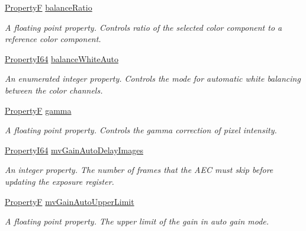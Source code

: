 \begin{DoxyCompactItemize}
\hyperlink{group___common_interface_gaf54865fe5a3d5cfd15f9a111b40d09f9}{Property\+F} \hyperlink{classmv_i_m_p_a_c_t_1_1acquire_1_1_gen_i_cam_1_1_analog_control_a7550a0dcc2b4d71a9431ba0090d857fc}{balance\+Ratio}
\begin{DoxyCompactList}\small\item\em A floating point property. Controls ratio of the selected color component to a reference color component. \end{DoxyCompactList}\item 
\hyperlink{group___common_interface_ga81749b2696755513663492664a18a893}{Property\+I64} \hyperlink{classmv_i_m_p_a_c_t_1_1acquire_1_1_gen_i_cam_1_1_analog_control_ac5a72d071c6ab6041347ec52179b0432}{balance\+White\+Auto}
\begin{DoxyCompactList}\small\item\em An enumerated integer property. Controls the mode for automatic white balancing between the color channels. \end{DoxyCompactList}\item 
\hyperlink{group___common_interface_gaf54865fe5a3d5cfd15f9a111b40d09f9}{Property\+F} \hyperlink{classmv_i_m_p_a_c_t_1_1acquire_1_1_gen_i_cam_1_1_analog_control_a89e3cff9a396ada4e88cc4910b5b03fb}{gamma}
\begin{DoxyCompactList}\small\item\em A floating point property. Controls the gamma correction of pixel intensity. \end{DoxyCompactList}\item 
\hyperlink{group___common_interface_ga81749b2696755513663492664a18a893}{Property\+I64} \hyperlink{classmv_i_m_p_a_c_t_1_1acquire_1_1_gen_i_cam_1_1_analog_control_a9312f2b8c8b6748cafbfc996a560550f}{mv\+Gain\+Auto\+Delay\+Images}
\begin{DoxyCompactList}\small\item\em An integer property. The number of frames that the A\+E\+C must skip before updating the exposure register. \end{DoxyCompactList}\item 
\hyperlink{group___common_interface_gaf54865fe5a3d5cfd15f9a111b40d09f9}{Property\+F} \hyperlink{classmv_i_m_p_a_c_t_1_1acquire_1_1_gen_i_cam_1_1_analog_control_a6f4577f138bdafe4556f06bc32b6cf4f}{mv\+Gain\+Auto\+Upper\+Limit}
\begin{DoxyCompactList}\small\item\em A floating point property. The upper limit of the gain in auto gain mode. \end{DoxyCompactList}\item 

\end{DoxyCompactItemize}
